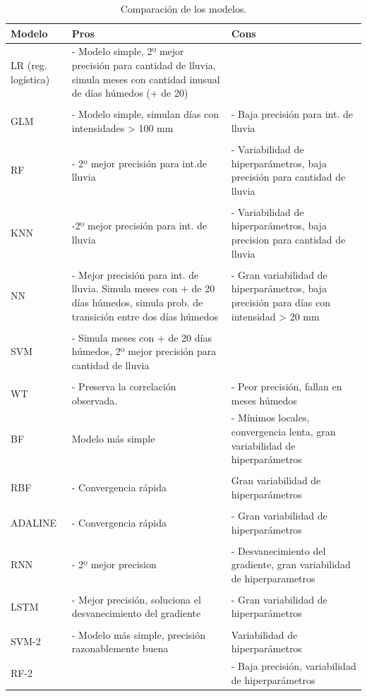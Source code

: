 \documentclass[12pt]{article}
\begin{document}
\begin{table}[h!]
\centering
\begin{tabular}{|p{2.0cm}|p{7.5cm}|p{7.0cm}| }
\hline
Modelo  & Pros& Cons \\
\hline
LR (reg. logística) &- Modelo simple, 2º mejor precisión para cantidad de lluvia, simula meses con cantidad inusual de días húmedos (+ de 20)&\\
&&\\
GLM & - Modelo simple, simulan días con intensidades > 100 mm  &  - Baja precisión para int. de lluvia\\
 &&\\
RF &  - 2º mejor precisión para int.de lluvia& - Variabilidad de hiperparámetros, baja precisión para cantidad de lluvia\\
 &&\\
 KNN& -2º mejor precisión para int. de lluvia& - Variabilidad de hiperparámetros,  baja precision para cantidad de lluvia\\
 &&\\
NN& - Mejor precisión para int. de lluvia. Simula meses con + de 20 días húmedos, simula prob. de transición entre dos días húmedos& - Gran variabilidad de hiperparámetros, baja precisión para días con intensidad > 20 mm \\
&&\\
SVM   &- Simula meses con + de 20 días húmedos, 2º mejor precisión para cantidad de lluvia  &\\
 &&\\
  WT & - Preserva la correlación observada.
& - Peor precisión, fallan en meses húmedos \\
\hline
BF&Modelo más simple  &- Mínimos locales, convergencia lenta, gran variabilidad de hiperparámetros\\
&&\\
RBF&- Convergencia rápida& Gran variabilidad de hiperparámetros\\
&&\\
ADALINE&- Convergencia rápida&- Gran variabilidad de hiperparámetros\\
&&\\
\hline
RNN&- 2º mejor precision&- Desvanecimiento del gradiente,  gran variabilidad de hiperparametros\\
&&\\
LSTM&- Mejor precisión, soluciona el desvanecimiento del gradiente&- Gran variabilidad de hiperparámetros\\
&&\\
SVM-2&- Modelo más simple, precisión razonablemente buena& Variabilidad de hiperparámetros\\
RF-2&&- Baja precisión, variabilidad de hiperparámetros\\
\hline
\end{tabular}
\caption{Comparación de los modelos.}
 \label{tabla_res}
\end{table}
\end{document}
